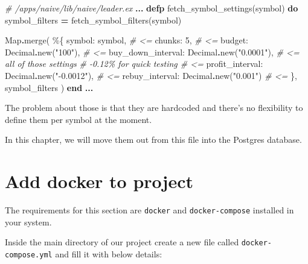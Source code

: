 \documentclass[
  oneside]{book}
\newenvironment{Shaded}{\begin{snugshade}}{\end{snugshade}}
\newcommand{\CommentTok}[1]{\textcolor[rgb]{0.56,0.35,0.01}{\textit{#1}}}
\newcommand{\ConstantTok}[1]{\textcolor[rgb]{0.00,0.00,0.00}{#1}}
\newcommand{\DecValTok}[1]{\textcolor[rgb]{0.00,0.00,0.81}{#1}}
\newcommand{\KeywordTok}[1]{\textcolor[rgb]{0.13,0.29,0.53}{\textbf{#1}}}
\newcommand{\NormalTok}[1]{#1}
\newcommand{\OperatorTok}[1]{\textcolor[rgb]{0.81,0.36,0.00}{\textbf{#1}}}
\newcommand{\StringTok}[1]{\textcolor[rgb]{0.31,0.60,0.02}{#1}}
\newcommand{\VariableTok}[1]{\textcolor[rgb]{0.00,0.00,0.00}{#1}}
\begin{document}
\begin{Shaded}
\begin{Highlighting}[]
  \CommentTok{\# /apps/naive/lib/naive/leader.ex}
  \OperatorTok{...}
  \KeywordTok{defp}\NormalTok{ fetch\_symbol\_settings(symbol) }\KeywordTok{do}
\NormalTok{    symbol\_filters }\OperatorTok{=}\NormalTok{ fetch\_symbol\_filters(symbol)}

    \ConstantTok{Map}\OperatorTok{.}\NormalTok{merge(}
\NormalTok{      \%\{}
        \VariableTok{symbol:}\NormalTok{ symbol,                           }\CommentTok{\# \textless{}=}
        \VariableTok{chunks:} \DecValTok{5}\NormalTok{,                                }\CommentTok{\# \textless{}=}
        \VariableTok{budget:} \ConstantTok{Decimal}\OperatorTok{.}\NormalTok{new(}\StringTok{"100"}\NormalTok{),               }\CommentTok{\# \textless{}=}
        \VariableTok{buy\_down\_interval:} \ConstantTok{Decimal}\OperatorTok{.}\NormalTok{new(}\StringTok{"0.0001"}\NormalTok{), }\CommentTok{\# \textless{}= all of those settings}
        \CommentTok{\# {-}0.12\% for quick testing                \# \textless{}=}
        \VariableTok{profit\_interval:} \ConstantTok{Decimal}\OperatorTok{.}\NormalTok{new(}\StringTok{"{-}0.0012"}\NormalTok{),  }\CommentTok{\# \textless{}=}
        \VariableTok{rebuy\_interval:} \ConstantTok{Decimal}\OperatorTok{.}\NormalTok{new(}\StringTok{"0.001"}\NormalTok{)      }\CommentTok{\# \textless{}=}
\NormalTok{      \},}
\NormalTok{      symbol\_filters}
\NormalTok{    )}
  \KeywordTok{end}
  \OperatorTok{...}
\end{Highlighting}
\end{Shaded}

The problem about those is that they are hardcoded and there's no flexibility to define them per symbol at the moment.

In this chapter, we will move them out from this file into the Postgres database.

\hypertarget{add-docker-to-project}{%
\section{Add docker to project}\label{add-docker-to-project}}

The requirements for this section are \texttt{docker} and \texttt{docker-compose} installed in your system.

Inside the main directory of our project create a new file called \texttt{docker-compose.yml} and fill it with below details:
\end{document}
